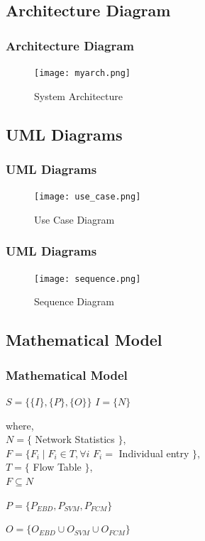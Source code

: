 \documentclass[10pt]{beamer}
\begin{document}
\begin{frame}
\section[]{Architecture Diagram}
\frametitle{Architecture Diagram}
\begin{figure}[H]
\texttt{[image: myarch.png]}
\caption{\footnotesize System Architecture}
\end{figure}
\end{frame}


\begin{frame}
\section[]{UML Diagrams}
\frametitle{UML Diagrams}
\begin{figure}
\texttt{[image: use\_case.png]}
\caption{\footnotesize Use Case Diagram}
\end{figure}
\end{frame}

\begin{frame}
\frametitle{UML Diagrams}
\begin{figure}
\texttt{[image: sequence.png]}
\caption{\footnotesize Sequence Diagram}
\end{figure}
\end{frame}


\begin{frame}
\section[]{Mathematical Model}
\frametitle{Mathematical Model}
\footnotesize
$S = \lbrace \lbrace I \rbrace ,\lbrace P \rbrace ,\lbrace O \rbrace \rbrace $\newline\newline
$I = \lbrace N \rbrace$

\noindent
where,\\
$N = \lbrace $ Network Statistics $ \rbrace $, \\
$F =\lbrace F_{i} \mid F_{i} \in T , \forall i$ $ F_{i} =$ Individual entry $ \rbrace$, \\
$T = \lbrace $ Flow Table $ \rbrace$, \\
$F \subseteq N$
\newline

$P = \lbrace P_{EBD}, P_{SVM}, P_{FCM} \rbrace$
\newline

$O = \lbrace O_{EBD} \cup O_{SVM} \cup O_{FCM} \rbrace$

\end{frame}
\end{document}
